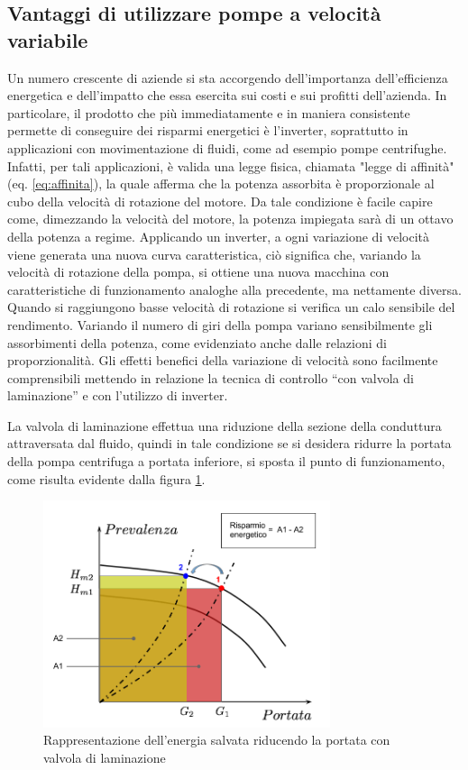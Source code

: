 \documentclass[laurea,oneside,11pt]{USiena_tesiLM}
\begin{document}
\subsection{Vantaggi di utilizzare pompe a velocità variabile}
Un numero crescente di aziende si sta accorgendo dell'importanza dell'efficienza energetica e dell'impatto che essa esercita sui costi e sui profitti dell'azienda.
In particolare, il prodotto che più immediatamente e in maniera consistente permette di conseguire dei risparmi energetici è l'inverter, soprattutto in applicazioni con movimentazione di fluidi, come ad esempio pompe centrifughe. Infatti, per tali applicazioni, è valida una legge fisica, chiamata "legge di affinità" (eq. \ref{eq:affinita}), la quale afferma che la potenza assorbita è proporzionale al cubo della velocità di rotazione del motore. Da tale condizione è facile capire come, dimezzando la velocità del motore, la potenza impiegata sarà di un ottavo della potenza a regime. 
Applicando un inverter, a ogni variazione di velocità viene generata una nuova curva caratteristica, ciò significa che, variando la velocità di rotazione della pompa, si ottiene una nuova macchina con caratteristiche di funzionamento analoghe alla precedente, ma nettamente diversa. Quando si raggiungono basse velocità di rotazione si verifica un calo sensibile del rendimento. Variando il numero di giri della pompa variano sensibilmente gli assorbimenti della potenza, come evidenziato anche dalle relazioni di proporzionalità. Gli effetti benefici della variazione di velocità sono facilmente comprensibili mettendo in relazione la tecnica di controllo “con valvola di laminazione” e con l’utilizzo di inverter. 

La valvola di laminazione effettua una riduzione della sezione della conduttura attraversata dal fluido, quindi in tale condizione se si desidera ridurre la portata della pompa centrifuga a portata inferiore, si sposta il punto di funzionamento, come risulta evidente dalla figura \ref{fig:strozzatura}.

\begin{figure}[!ht]
\centering
\includegraphics[width=0.75\textwidth]{figure/strozzatura} 
\caption{Rappresentazione dell'energia salvata riducendo la portata con valvola di laminazione}
\label{fig:strozzatura}
\end{figure}
\end{document}
